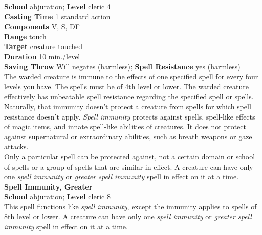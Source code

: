 \textbf{School} abjuration; \textbf{Level} cleric 4\\
\textbf{Casting Time} 1 standard action\\
\textbf{Components} V, S, DF\\
\textbf{Range} touch\\
\textbf{Target} creature touched\\
\textbf{Duration} 10 min./level\\
\textbf{Saving Throw }Will negates (harmless); \textbf{Spell Resistance} yes (harmless)\\
The warded creature is immune to the effects of one specified spell for every four levels you have. The spells must be of 4th level or lower. The warded creature effectively has unbeatable spell resistance regarding the specified spell or spells. Naturally, that immunity doesn't protect a creature from spells for which spell resistance doesn't apply. \textit{Spell immunity }protects against spells, spell-like effects of magic items, and innate spell-like abilities of creatures. It does not protect against supernatural or extraordinary abilities, such as breath weapons or gaze attacks.\\
Only a particular spell can be protected against, not a certain domain or school of spells or a group of spells that are similar in effect. A creature can have only one \textit{spell immunity }or \textit{greater spell immunity }spell in effect on it at a time.\\
\textbf{Spell Immunity, Greater}\\
\textbf{School} abjuration; \textbf{Level} cleric 8\\
This spell functions like \textit{spell immunity}, except the immunity applies to spells of 8th level or lower. A creature can have only one \textit{spell immunity }or \textit{greater spell immunity }spell in effect on it at a time.\\
